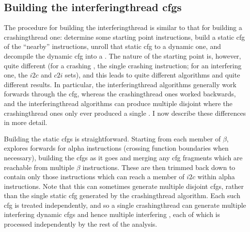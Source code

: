 \subsection[Building the \glsentrytext{interferingthread} \glsentrytext{cfg}s]{Building the \gls{interferingthread} \glspl{cfg}}

The procedure for building the \gls{interferingthread}
{\StateMachines} is similar to that for building a
\gls{crashingthread} one: determine some starting point instructions,
build a static \gls{cfg} of the ``nearby'' instructions, unroll that
static \gls{cfg} to a dynamic one, and decompile the dynamic \gls{cfg}
into a {\StateMachine}.  The nature of the starting point is, however,
quite different (for a crashing {\StateMachine}, the single crashing
instruction; for an interfering one, the $i2c$ and $c2i$ sets), and
this leads to quite different algorithms and quite different results.
In particular, the \gls{interferingthread} algorithms generally work
forwards through the \gls{cfg}, whereas the \gls{crashingthread} ones
worked backwards, and the \gls{interferingthread} algorithms can
produce multiple disjoint {\StateMachines} where the
\gls{crashingthread} ones only ever produced a single {\StateMachine}.
I now describe these differences in more detail.

Building the static \glspl{cfg} is straightforward.  Starting from
each member of $\beta$, {\technique} explores forwards for \gls{alpha}
instructions (crossing function boundaries when necessary), building
the \glspl{cfg} as it goes and merging any \gls{cfg} fragments which
are reachable from multiple $\beta$ instructions.  These are then
trimmed back down to contain only those instructions which can reach a
member of $i2c$ within \gls{alpha} instructions.  Note that this can
sometimes generate multiple disjoint \glspl{cfg}, rather than the
single static \gls{cfg} generated by the \gls{crashingthread}
algorithm.  Each such \gls{cfg} is treated independently, and so a
single \gls{crashingthread} can generate multiple interfering dynamic
\glspl{cfg} and hence multiple interfering {\StateMachines}, each of
which is processed independently by the rest of the analysis.

